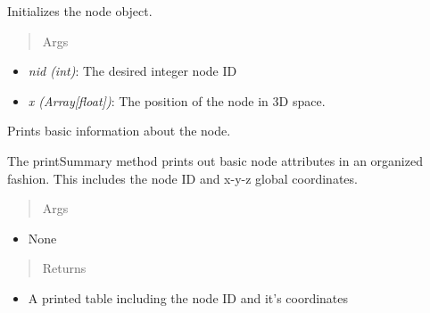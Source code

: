 \documentclass[letterpaper,10pt,english]{sphinxmanual}
\begin{document}
\begin{fulllineitems}
\begin{fulllineitems}
\label{structures:AeroComBAT.Structures.Node.__init__}
Initializes the node object.
\begin{quote}\begin{description}
\item[{Args}] \leavevmode
\end{description}\end{quote}
\begin{itemize}
\item {} 
\emph{nid (int)}: The desired integer node ID

\item {} 
\emph{x (Array{[}float{]})}: The position of the node in 3D space.

\end{itemize}

\end{fulllineitems}


\begin{fulllineitems}
\label{structures:AeroComBAT.Structures.Node.printSummary}
Prints basic information about the node.

The printSummary method prints out basic node attributes in an organized
fashion. This includes the node ID and x-y-z global coordinates.
\begin{quote}\begin{description}
\item[{Args}] \leavevmode
\end{description}\end{quote}
\begin{itemize}
\item {} 
None

\end{itemize}
\begin{quote}\begin{description}
\item[{Returns}] \leavevmode
\end{description}\end{quote}
\begin{itemize}
\item {} 
A printed table including the node ID and it's coordinates

\end{itemize}

\end{fulllineitems}


\end{fulllineitems}
\end{document}
